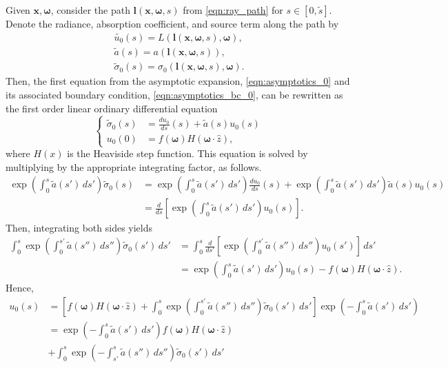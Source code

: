 \documentclass[ms,cpyr,lof,lot]{uathesis}
\renewcommand\vec\bm
\begin{document}
Given $\vec{x}, \vec{\omega}$, consider the path $\vec{l}(\vec{x}, \vec{\omega}, s)$ from \eqref{eqn:ray_path} for $s \in [0, \tilde{s}]$.
Denote the radiance, absorption coefficient, and source term along the path by
\begin{align*}
  \tilde{u_0}(s) = L(\vec{l}(\vec{x}, \vec{\omega}, s), \vec{\omega}), \\
  \tilde{a}(s) = a(\vec{l}(\vec{x}, \vec{\omega}, s)), \\
  \tilde\sigma_0(s) = \sigma_0(\vec{l}(\vec{x}, \vec{\omega}, s), \vec{\omega}).
\end{align*}
Then, the first equation from the asymptotic expansion, \eqref{eqn:asymptotics_0} and its associated boundary condition, \eqref{eqn:asymptotics_bc_0}, can be rewritten as the first order linear ordinary differential equation
\begin{equation}
  \left\{
  \begin{aligned}
  \tilde\sigma_0(s) &= \frac{du_0}{ds}(s) + \tilde{a}(s) u_0(s) \\
  u_0(0) &= f(\vec{\omega})H(\vec{\omega}\cdot\hat{z}),
  \end{aligned}
  \right.
  \label{eqn:asymptotics_ode_0}
\end{equation}
where $H(x)$ is the Heaviside step function.
This equation is solved by multiplying by the appropriate integrating factor, as follows.
\begin{align*}
  \exp\left(\int_0^s \tilde{a}(s')\, ds'\right)\tilde\sigma_0(s) &= \exp\left(\int_0^s \tilde{a}(s')\, ds'\right) \frac{du_0}{ds}(s) + \exp\left(\int_0^s \tilde{a}(s')\, ds'\right) \tilde{a}(s) u_0(s) \\
  &= \frac{d}{ds}\left[\exp\left(\int_0^s \tilde{a}(s')\, ds'\right) u_0(s)\right].
\end{align*}
Then, integrating both sides yields
\begin{align*}
  \int_0^s \exp\left(\int_0^{s'} \tilde{a}(s'')\, ds''\right)\tilde\sigma_0(s')\, ds' &= \int_0^s \frac{d}{ds'}\left[\exp\left(\int_0^{s'} \tilde{a}(s'')\, ds''\right) u_0(s')\right]\, ds' \\
  &= \exp\left(\int_0^s \tilde{a}(s')\, ds'\right) u_0(s) - f(\vec{\omega})H(\vec{\omega}\cdot\hat{z}).
\end{align*}
Hence,
\begin{align}
  u_0(s) &= \left[f(\vec{\omega})H(\vec{\omega}\cdot\hat{z}) + \int_0^s \exp\left(\int_0^{s'} \tilde{a}(s'')\, ds''\right) \tilde\sigma_0(s')\, ds'\right] \exp\left(-\int_0^s \tilde{a}(s')\, ds'\right) \nonumber\\
  &= \exp\left(-\int_0^s \tilde{a}(s')\, ds'\right) f(\vec{\omega})H(\vec{\omega}\cdot\hat{z}) \nonumber\\
    &+ \int_0^s \exp\left(-\int_{s'}^s \tilde{a}(s'')\, ds''\right) \tilde\sigma_0(s')\, ds'
  \label{eqn:asymptotics_soln_0}
\end{align}
\end{document}
